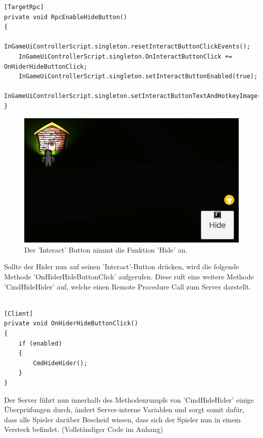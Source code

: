 \begin{lstlisting}[caption= HiderScript.cs Subscribe to InGameUiControllerScript Event]
[TargetRpc]
private void RpcEnableHideButton()
{
	InGameUiControllerScript.singleton.resetInteractButtonClickEvents();
	InGameUiControllerScript.singleton.OnInteractButtonClick += OnHiderHideButtonClick;
	InGameUiControllerScript.singleton.setInteractButtonEnabled(true);
	InGameUiControllerScript.singleton.setInteractButtonTextAndHotkeyImage('Hide');
}
\end{lstlisting}

\begin{figure}[H]
	\centering
	\includegraphics[width=120mm]{images/prototyp_hider_hide_button.png}
	\caption[Hider Hide Button]{Der 'Interact' Button nimmt die Funktion 'Hide' an.}
	\label{pic:prototyp_hider_hide_button}
\end{figure}

Sollte der Hider nun auf seinen 'Interact'-Button drücken, wird die folgende Methode 'OnHiderHideButtonClick' aufgerufen. Diese ruft eine weitere Methode 'CmdHideHider' auf, welche einen Remote Procedure Call\cite{.05.02.2022} zum Server darstellt.

\begin{lstlisting}[caption= HiderScript.csOnHiderHideButtonClick() Method]

[Client]
private void OnHiderHideButtonClick()
{
	if (enabled)
	{
		CmdHideHider();
	}
}

\end{lstlisting}

Der Server führt nun innerhalb des Methodenrumpfs von 'CmdHideHider' einige Überprüfungen durch, ändert Server-interne Variablen und sorgt somit dafür, dass alle Spieler darüber Bescheid wissen, dass sich der Spieler nun in einem Versteck befindet. (Vollständiger Code im Anhang)

